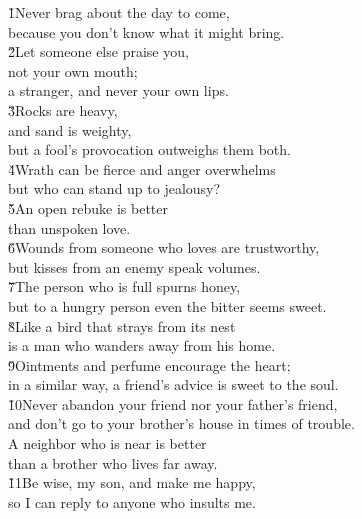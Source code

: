 \begin{poetry}
\poeml {}
\v{1}Never brag about the day to come, \\
\poeml because you don't know what it might bring. \\
\poeml \v{2}Let someone else praise you, \\
\poemll    not your own mouth; \\
\poemlll       a stranger, and never your own lips. \\
\poeml \v{3}Rocks are heavy, \\
\poemll    and sand is weighty, \\
\poemlll       but a fool's provocation outweighs them both. \\
\poeml \v{4}Wrath can be fierce and anger overwhelms \\
\poemll    but who can stand up to jealousy? \\
\poeml \v{5}An open rebuke is better \\
\poemll    than unspoken love. \\
\poeml \v{6}Wounds from someone who loves are trustworthy, \\
\poemll    but kisses from an enemy speak volumes. \\
\poeml \v{7}The person who is full spurns honey, \\
\poemll    but to a hungry person even the bitter seems sweet. \\
\poeml \v{8}Like a bird that strays from its nest \\
\poemll    is a man who wanders away from his home. \\
\poeml \v{9}Ointments and perfume encourage the heart; \\
\poemll    in a similar way, a friend's advice is sweet to the soul. \\
\poeml \v{10}Never abandon your friend nor your father's friend, \\
\poemll    and don't go to your brother's house in times of trouble. \\
\poeml A neighbor who is near is better \\
\poemll    than a brother who lives far away. \\
\poeml \v{11}Be wise, my son, and make me happy, \\
\poemll    so I can reply to anyone who insults me. \\

\end{poetry}
